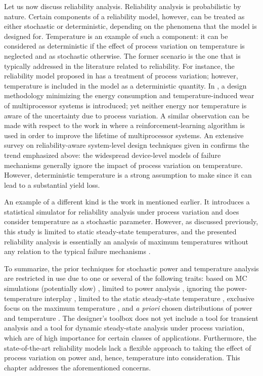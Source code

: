 Let us now discuss reliability analysis. Reliability analysis is probabilistic
by nature. Certain components of a reliability model, however, can be treated as
either stochastic or deterministic, depending on the phenomena that the model is
designed for. Temperature is an example of such a component: it can be
considered as deterministic if the effect of process variation on temperature is
neglected and as stochastic otherwise. The former scenario is the one that is
typically addressed in the literature related to reliability. For instance, the
reliability model proposed in \cite{xiang2010} has a treatment of process
variation; however, temperature is included in the model as a deterministic
quantity. In \cite{das2014a}, a design methodology minimizing the energy
consumption and temperature-induced wear of multiprocessor systems is
introduced; yet neither energy nor temperature is aware of the uncertainty due
to process variation. A similar observation can be made with respect to the work
in \cite{das2014c} where a reinforcement-learning algorithm is used in order to
improve the lifetime of multiprocessor systems. An extensive survey on
reliability-aware system-level design techniques given in \cite{das2014b}
confirms the trend emphasized above: the widespread device-level models of
failure mechanisms generally ignore the impact of process variation on
temperature. However, deterministic temperature is a strong assumption to make
since it can lead to a substantial yield loss.

An example of a different kind is the work in \cite{lee2013} mentioned earlier.
It introduces a statistical simulator for reliability analysis under process
variation and does consider temperature as a stochastic parameter. However, as
discussed previously, this study is limited to static steady-state temperatures,
and the presented reliability analysis is essentially an analysis of maximum
temperatures without any relation to the typical failure mechanisms
\cite{jedec2016}.

To summarize, the prior techniques for stochastic power and temperature analysis
are restricted in use due to one or several of the following traits: based on
\ac{MC} simulations (potentially slow) \cite{chandra2010}, limited to power
analysis \cite{bhardwaj2006, ghanta2006, vrudhula2006, bhardwaj2008, shen2009,
chandra2010}, ignoring the power-temperature interplay \cite{bhardwaj2006,
ghanta2006, vrudhula2006, bhardwaj2008, huang2009a, shen2009}, limited to the
static steady-state temperature \cite{huang2009a, juan2011, juan2012, lee2013},
exclusive focus on the maximum temperature \cite{juan2011}, and \emph{a priori}
chosen distributions of power and temperature \cite{bhardwaj2006,
srivastava2010, juan2012}. The designer's toolbox does not yet include a tool
for transient analysis and a tool for dynamic steady-state analysis under
process variation, which are of high importance for certain classes of
applications. Furthermore, the state-of-the-art reliability models lack a
flexible approach to taking the effect of process variation on power and, hence,
temperature into consideration. This chapter addresses the aforementioned
concerns.
